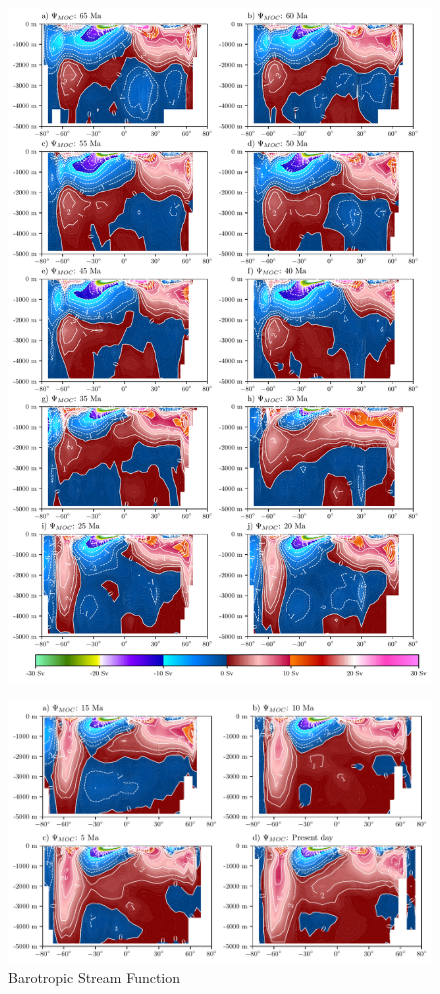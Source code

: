 \documentclass[a4paper]{article}
\begin{document}
\begin{multicols}{2}



\end{multicols}
\begin{figure}[H]

\includegraphics[width=1\linewidth]{MOC_1.pdf}
\end{figure}
\begin{figure}[H]
\includegraphics[width=1\linewidth]{MOC_2.pdf}
\caption{Barotropic Stream Function}
\label{fig:moc_total}
\end{figure}
\end{document}

